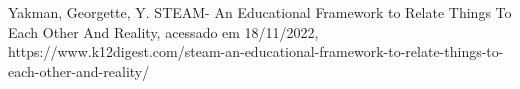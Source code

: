 \documentclass[
12pt,		%
openright,	%
twoside,  %
a4paper,			%
chapter=TITLE,		%
english,			%
french,				%
spanish,			%
brazil				%
]{USPSC-classe/USPSC}
\begin{document}
\begin{flushleft}
\begin{flushleft}
\begin{flushleft}
\begin{flushleft}
\begin{flushleft}
\begin{flushleft}
\begin{flushleft}
\begin{flushleft}
\begin{flushleft}
\begin{flushleft}
[YAKMAN, 2019] Yakman, Georgette, Y. STEAM- An Educational Framework to Relate Things To Each Other And Reality, acessado em 18/11/2022, https://www.k12digest.com/steam-an-educational-framework-to-relate-things-to-each-other-and-reality/
\end{flushleft}


\end{flushleft}


\end{flushleft}


\end{flushleft}


\end{flushleft}


\end{flushleft}


\end{flushleft}


\end{flushleft}


\end{flushleft}


\end{flushleft}
\end{document}
